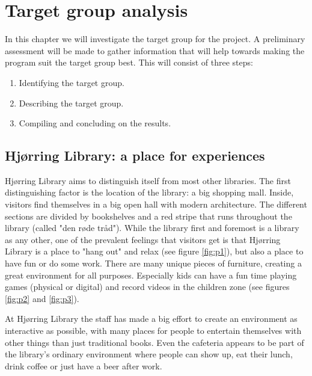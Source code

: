 \chapter{Target group analysis}
In this chapter we will investigate the target group for the project. A preliminary assessment will be made to gather information that will help towards making the program suit the target group best. This will consist of three steps:

\begin{enumerate}
\item Identifying the target group.
\item Describing the target group.
\item Compiling and concluding on the results.
\end{enumerate}

\section{Hj{\o}rring Library: a place for experiences}\label{hjoerring}

Hj{\o}rring Library aims to distinguish itself from most other libraries. The first distinguishing factor is the location of the library: a big shopping mall. Inside, visitors find themselves in a big open hall with modern architecture. The different sections are divided by bookshelves and a red stripe that runs throughout the library (called "den r{\o}de tr{\aa}d"). While the library first and foremost is a library as any other, one of the prevalent feelings that visitors get is that Hj{\o}rring Library is a place to "hang out" and relax (see figure \ref{fig:p1}), but also a place to have fun or do some work. There are many unique pieces of furniture, creating a great environment for all purposes. Especially kids can have a fun time playing games (physical or digital) and record videos in the children zone (see figures \ref{fig:p2} and \ref{fig:p3}).

At Hj{\o}rring Library the staff has made a big effort to create an environment as interactive as possible, with many places for people to entertain themselves with other things than just traditional books. Even the cafeteria appears to be part of the library's ordinary environment where people can show up, eat their lunch, drink coffee or just have a beer after work.

